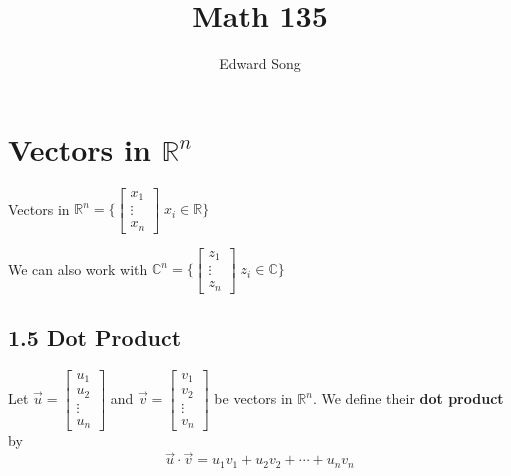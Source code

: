 \documentclass[11pt]{article}
\title{Math 135}
\author{Edward Song}
\theoremstyle{plain}
\theoremstyle{remark}
\theoremstyle{plain}
\newcommand{\bd}{\textbf}
\newcommand{\z}{\mathbb{Z}}
\newcommand{\rn}{\mathbb{R}}
\begin{document}
\section{Vectors in $\rn^n$}


   



\begin{tcolorbox}[colback=red!5!white,colframe=red!75!black,title=Recall]
    Vectors in $\rn^n = \{\begin{bmatrix}
        x_1\\\vdots\\x_n
    \end{bmatrix}\; x_i\in\rn\}$

    We can also work with $\mathbb{C}^n = \{\begin{bmatrix}
        z_1\\\vdots\\z_n
    \end{bmatrix}\; z_i\in\mathbb{C}\}$
        
\end{tcolorbox}   

\subsection*{1.5 Dot Product}
\begin{tcolorbox}[colback=green!5!white,colframe=green!75!black,title=Definition]
    Let $\overrightarrow{u} = \begin{bmatrix}
        u_1\\u_2\\\vdots\\u_n
    \end{bmatrix}$ and $\overrightarrow{v} = \begin{bmatrix}
        v_1\\v_2\\\vdots\\v_n
    \end{bmatrix}$ be vectors in $\rn^n$. We define their \bd{dot product} by \[\overrightarrow{u}\cdot\overrightarrow{v} = u_1v_1+u_2v_2+\cdots+u_nv_n\]
\end{tcolorbox}   
\end{document}
